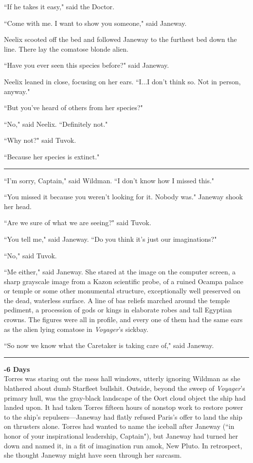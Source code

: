 \documentclass[twoside,letterpaper,12pt]{memoir}
\begin{document}
``If he takes it easy," said the Doctor. 

``Come with me. I want to show you someone," said Janeway. 

Neelix scooted off the bed and followed Janeway to the furthest bed down the line. There lay the comatose blonde alien. 

``Have you ever seen this species before?" said Janeway. 

Neelix leaned in close, focusing on her ears. ``I...I don't think so. Not in person, anyway." 

``But you've heard of others from her species?" 

``No," said Neelix. ``Definitely not." 

``Why not?" said Tuvok. 

``Because her species is extinct." 

\begin{center}\rule{3cm}{0.4 pt}\end{center} 

``I'm sorry, Captain," said Wildman. ``I don't know how I missed this." 

``You missed it because you weren't looking for it. Nobody was." Janeway shook her head. 

``Are we sure of what we are seeing?" said Tuvok. 

``You tell me," said Janeway. ``Do you think it's just our imaginations?" 

``No," said Tuvok. 

``Me either," said Janeway. She stared at the image on the computer screen, a sharp grayscale image from a Kazon scientific probe, of a ruined Ocampa palace or temple or some other monumental structure, exceptionally well preserved on the dead, waterless surface. A line of bas reliefs marched around the temple pediment, a procession of gods or kings in elaborate robes and tall Egyptian crowns. The figures were all in profile, and every one of them had the same ears as the alien lying comatose in \textit{Voyager}'s sickbay. 

``So now we know what the Caretaker is taking care of," said Janeway. 

\begin{center}\rule{3cm}{0.4 pt}\end{center} 

\noindent\textbf{-6 Days}\\

Torres was staring out the mess hall windows, utterly ignoring Wildman as she blathered about dumb Starfleet bullshit. Outside, beyond the sweep of \textit{Voyager}'s primary hull, was the gray-black landscape of the Oort cloud object the ship had landed upon. It had taken Torres fifteen hours of nonstop work to restore power to the ship's repulsers---Janeway had flatly refused Paris's offer to land the ship on thrusters alone. Torres had wanted to name the iceball after Janeway (``in honor of your inspirational leadership, Captain"), but Janeway had turned her down and named it, in a fit of imagination run amok, New Pluto. In retrospect, she thought Janeway might have seen through her sarcasm. 
\end{document}
